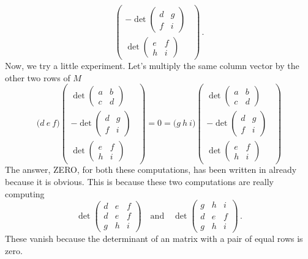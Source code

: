 {\[\begin{pmatrix}
-\det\begin{pmatrix}d&g\\f&i\end{pmatrix}\ \ \\[2mm]
\det\begin{pmatrix}e&f\\h&i\end{pmatrix}\end{pmatrix}\, .
\]
Now, we try a little experiment. Let's multiply the same column vector by the other two rows of $M$
\[
 \Big( d \ e \ f \Big)
\begin{pmatrix} \det\begin{pmatrix}a&b\\c&d\end{pmatrix}\\[2mm]
-\det\begin{pmatrix}d&g\\f&i\end{pmatrix}\ \ \\[2mm]
\det\begin{pmatrix}e&f\\h&i\end{pmatrix}\end{pmatrix} = 0 =
 \Big( g \ h \ i \Big)
\begin{pmatrix} \det\begin{pmatrix}a&b\\c&d\end{pmatrix}\\[2mm]
-\det\begin{pmatrix}d&g\\f&i\end{pmatrix}\ \ \\[2mm]
\det\begin{pmatrix}e&f\\h&i\end{pmatrix}\end{pmatrix}
\]
The answer, ZERO, for both these computations, has been written in already because it is obvious. This is because these two computations are really computing
\[
\det\begin{pmatrix}
d &e&f\\d&e&f\\g&h&i\end{pmatrix}
\quad\mbox{and} \quad \det\begin{pmatrix}
g &h&i\\d&e&f\\g&h&i\end{pmatrix}\, .
\]
These vanish because the determinant of an matrix with a pair of equal rows is zero.
}
